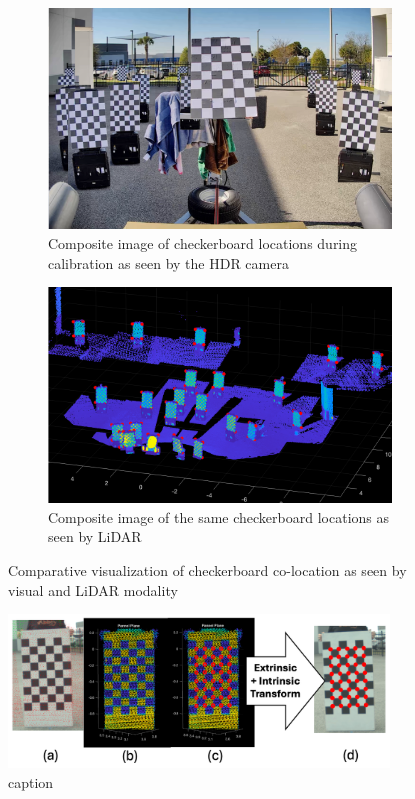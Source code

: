 \begin{figure}[htbp]
\centering
\begin{subfigure}[t]{0.45\textwidth}
    \centering
    \includegraphics[width=\textwidth]{Images/checkerboard.png}
    \caption{Composite image of checkerboard locations during calibration as seen by the HDR camera}
    \label{fig:chkrbds_vision}
\end{subfigure}
\hfill
\begin{subfigure}[t]{0.45\textwidth}
    \centering
    \includegraphics[width=\textwidth]{Images/lidar_calib.png}
    \caption{Composite image of the same checkerboard locations as seen by LiDAR}
    \label{fig:chkrbds_lidar}
\end{subfigure}
\caption{Comparative visualization of checkerboard co-location as seen by visual and LiDAR modality}
\label{fig:camera_calib}
\end{figure}

\begin{figure}[htbp]
    \centering
    \includegraphics[width=0.9\textwidth]{Images/transform.png}
    \caption{caption}
    \label{fig:lidar_cam_calibration}
\end{figure}


